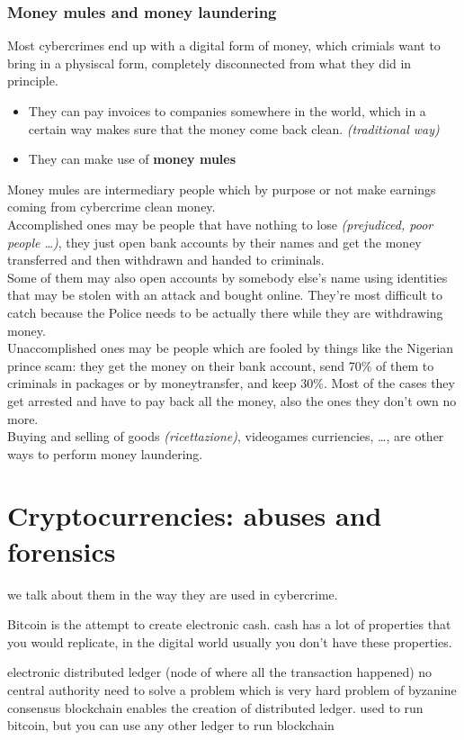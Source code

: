     \subsection{Money mules and money laundering}
        Most cybercrimes end up with a digital form of money, which crimials want to bring in a physiscal form, completely disconnected from what they did in principle.
        \begin{itemize}
            \item They can pay invoices to companies somewhere in the world, which in a certain way makes sure that the money come back clean. \textit{(traditional way)}
            \item They can make use of \textbf{money mules}
        \end{itemize}
        Money mules are intermediary people which by purpose or not make earnings coming from cybercrime clean money.\\
        Accomplished ones may be people that have nothing to lose \textit{(prejudiced, poor people \dots)}, they just open bank accounts by their names and get the money transferred and then withdrawn and handed to criminals.\\
        Some of them may also open accounts by somebody else's name using identities that may be stolen with an attack and bought online. They're most difficult to catch because the Police needs to be actually there while they are withdrawing money.
        \\Unaccomplished ones may be people which are fooled by things like the Nigerian prince scam: they get the money on their bank account, send 70\% of them to criminals in packages or by moneytransfer, and keep 30\%. Most of the cases they get arrested and have to pay back all the money, also the ones they don't own no more.\\
        Buying and selling of goods \textit{(ricettazione)}, videogames curriencies, \dots, are other ways to perform money laundering.
\iffalse
\chapter{Cryptocurrencies: abuses and forensics}
    we talk about them in the way they are used in cybercrime.

    Bitcoin is the attempt to create electronic cash.
    cash has a lot of properties that you would replicate, in the digital world usually you don't have these properties.

    electronic distributed ledger (node of where all the transaction happened)
        no central authority
        need to solve a problem which is very hard
        problem of byzanine consensus
        blockchain enables the creation of distributed ledger.
        used to run bitcoin, but you can use any other ledger to run blockchain

